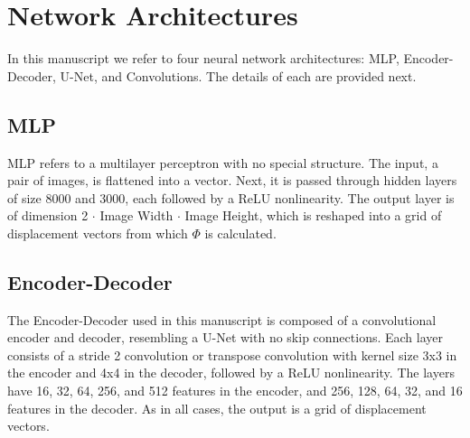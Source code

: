 



\section{Network Architectures}

In this manuscript we refer to four neural network architectures: MLP, Encoder-Decoder, U-Net, and Convolutions. The details of each are provided next.\\
\subsection{MLP} MLP refers to a multilayer perceptron with no special structure. The input, a pair of images, is flattened into a vector. Next, it is passed through hidden layers of size 8000 and 3000, each followed by a ReLU nonlinearity. The output layer is of dimension 2 $\cdot$ Image Width $\cdot$ Image Height, which is reshaped into a grid of displacement vectors from which $\Phi$ is calculated.\\
\subsection{Encoder-Decoder} The Encoder-Decoder used in this manuscript is composed of a convolutional encoder and decoder, resembling a U-Net with no skip connections. Each layer consists of a stride 2 convolution or transpose convolution with kernel size 3x3 in the encoder and 4x4 in the decoder, followed by a ReLU nonlinearity. The layers have 16, 32, 64, 256, and 512 features in the encoder, and 256, 128, 64, 32, and 16  features in the decoder. As in all cases, the output is a grid of displacement vectors.\\
